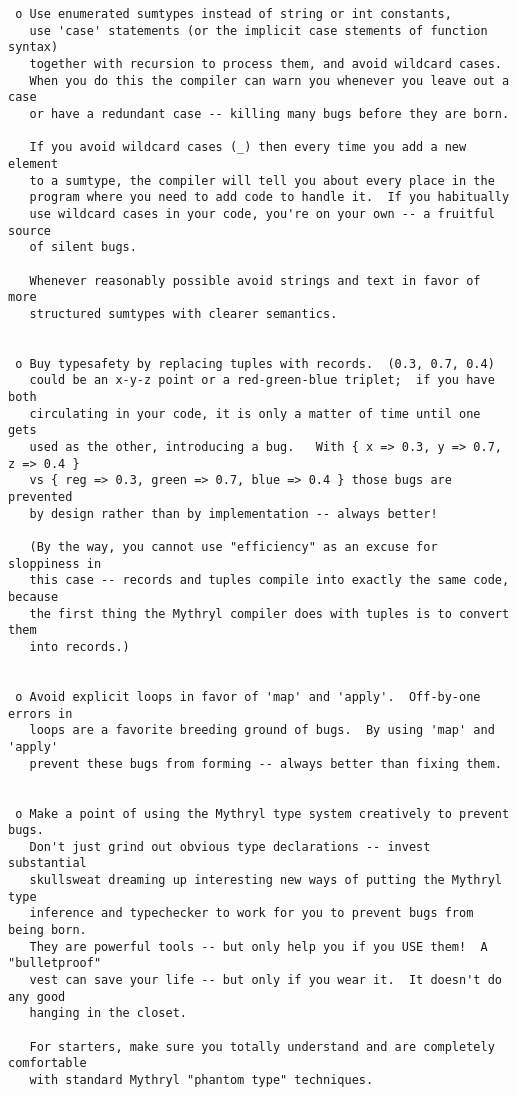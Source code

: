 \begin{verbatim}
 o Use enumerated sumtypes instead of string or int constants,
   use 'case' statements (or the implicit case stements of function syntax)
   together with recursion to process them, and avoid wildcard cases.
   When you do this the compiler can warn you whenever you leave out a case
   or have a redundant case -- killing many bugs before they are born.

   If you avoid wildcard cases (_) then every time you add a new element
   to a sumtype, the compiler will tell you about every place in the
   program where you need to add code to handle it.  If you habitually
   use wildcard cases in your code, you're on your own -- a fruitful source
   of silent bugs.

   Whenever reasonably possible avoid strings and text in favor of more
   structured sumtypes with clearer semantics.


 o Buy typesafety by replacing tuples with records.  (0.3, 0.7, 0.4)
   could be an x-y-z point or a red-green-blue triplet;  if you have both
   circulating in your code, it is only a matter of time until one gets
   used as the other, introducing a bug.   With { x => 0.3, y => 0.7, z => 0.4 }
   vs { reg => 0.3, green => 0.7, blue => 0.4 } those bugs are prevented
   by design rather than by implementation -- always better!

   (By the way, you cannot use "efficiency" as an excuse for sloppiness in
   this case -- records and tuples compile into exactly the same code, because
   the first thing the Mythryl compiler does with tuples is to convert them
   into records.)


 o Avoid explicit loops in favor of 'map' and 'apply'.  Off-by-one errors in
   loops are a favorite breeding ground of bugs.  By using 'map' and 'apply'
   prevent these bugs from forming -- always better than fixing them.


 o Make a point of using the Mythryl type system creatively to prevent bugs.
   Don't just grind out obvious type declarations -- invest substantial
   skullsweat dreaming up interesting new ways of putting the Mythryl type
   inference and typechecker to work for you to prevent bugs from being born.
   They are powerful tools -- but only help you if you USE them!  A "bulletproof"
   vest can save your life -- but only if you wear it.  It doesn't do any good
   hanging in the closet.

   For starters, make sure you totally understand and are completely comfortable
   with standard Mythryl "phantom type" techniques.


\end{verbatim}
